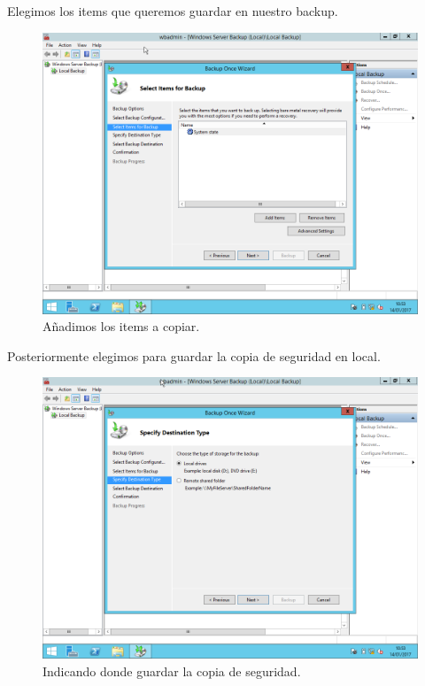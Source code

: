 \newpage
Elegimos los items que queremos guardar en nuestro backup.
\begin{figure}[H]
	\begin{center}
		\includegraphics[width=15cm]{Imagenes/Aniadimos_items_para_el_backup}
		\caption{Añadimos los items a copiar.}
		\label{fig:12}
	\end{center}
\end{figure}

\newpage
Posteriormente elegimos para guardar la copia de seguridad en local.
\begin{figure}[H]
	\begin{center}
		\includegraphics[width=15cm]{Imagenes/Indicando_donde_guardar_backup}
		\caption{Indicando donde guardar la copia de seguridad.}
		\label{fig:13}
	\end{center}
\end{figure}

